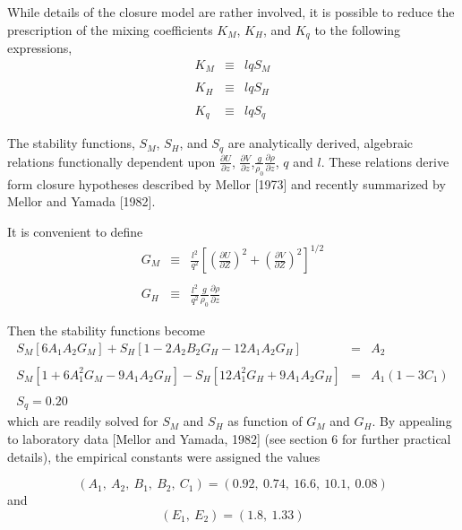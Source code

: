 \documentclass[oribibl]{llncs}
\begin{document}
While details of the closure model are rather involved, it is possible to reduce the prescription of the mixing coefficients $K_M$, $K_H$, and $K_q$ to the following expressions,
\begin{eqnarray}
K_M &\equiv& l q S_M \\ \nonumber \\
K_H &\equiv& l q S_H \\ \nonumber \\
K_q  &\equiv& l q S_q
\end{eqnarray}

The stability functions, $S_M$, $S_H$, and $S_q$ are analytically derived, algebraic relations functionally dependent upon $\frac{\partial U}{\partial z}$, $\frac{\partial V}{\partial z}$,$\frac{g}{\rho_0} \frac{\partial \rho}{\partial z}$, $q$ and $l$. These relations derive form closure hypotheses described by Mellor [1973] and recently summarized by Mellor and Yamada [1982].

It is convenient to define
\begin{eqnarray}
G_M &\equiv& \frac{l^2}{q^2} \left[ \left( \frac{\partial U}{\partial Z}\right)^2 + \left( \frac{\partial V}{\partial Z}\right)^2 \right]^{1/2} \\ \nonumber \\
G_H &\equiv& \frac{l^2}{q^2} \frac{g}{\rho_0}\frac{\partial \rho}{\partial z}
\end{eqnarray}

Then the stability functions become
\begin{eqnarray}
S_M [6 A_1 A_2 G_M] + S_H [1-2 A_2 B_2 G_H - 12 A_1 A_2 G_H] &=&A_2 \\ \nonumber \\
S_M [1+6 A_1^2 G_M -9 A_1 A_2 G_H] -S_H [12 A_1^2 G_H + 9 A_1 A_2 G_H] &=& A_1 (1-3 C_1)\\ \nonumber \\
S_q=0.20
\end{eqnarray}
which are readily solved for $S_M$ and $S_H$ as function of $G_M$ and $G_H$. By appealing to laboratory data [Mellor and Yamada, 1982] (see section 6 for further practical details), the empirical constants were assigned the values

\begin{equation}
(A_1,\ A_2,\ B_1,\ B_2,\ C_1) = (0.92,\ 0.74,\ 16.6,\ 10.1,\ 0.08)
\end{equation}
and
\begin{equation}
(E_1,\ E_2) = (1.8,\ 1.33)
\end{equation}
\end{document}
